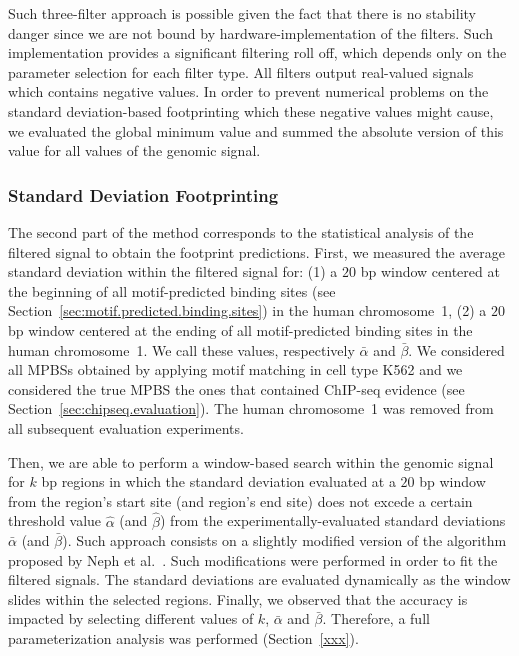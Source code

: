 Such three-filter approach is possible given the fact that there is no stability danger since we are not bound by hardware-implementation of the filters. Such implementation provides a significant filtering roll off, which depends only on the parameter selection for each filter type. All filters output real-valued signals which contains negative values. In order to prevent numerical problems on the standard deviation-based footprinting which these negative values might cause, we evaluated the global minimum value and summed the absolute version of this value for all values of the genomic signal.

\subsubsection{Standard Deviation Footprinting}
\label{sec:standard.deviation.footprinting}

The second part of the method corresponds to the statistical analysis of the filtered signal to obtain the footprint predictions. First, we measured the average standard deviation within the filtered signal for: (1) a $20$ bp window centered at the beginning of all motif-predicted binding sites (see Section~\ref{sec:motif.predicted.binding.sites}) in the human chromosome~1, (2) a $20$ bp window centered at the ending of all motif-predicted binding sites in the human chromosome~1. We call these values, respectively $ \bar{\alpha} $ and $ \bar{\beta} $. We considered all MPBSs obtained by applying motif matching in cell type K562 and we considered the true MPBS the ones that contained ChIP-seq evidence (see Section~\ref{sec:chipseq.evaluation}). The human chromosome~1 was removed from all subsequent evaluation experiments.

Then, we are able to perform a window-based search within the genomic signal for $ k $ bp regions in which the standard deviation evaluated at a $20$ bp window from the region's start site (and region's end site) does not excede a certain threshold value $ \hat{\alpha} $ (and $ \hat{\beta} $) from the experimentally-evaluated standard deviations $ \bar{\alpha} $ (and $ \bar{\beta} $). Such approach consists on a slightly modified version of the algorithm proposed by Neph et al.~\cite{neph2012a}. Such modifications were performed in order to fit the filtered signals. The standard deviations are evaluated dynamically as the window slides within the selected regions. Finally, we observed that the accuracy is impacted by selecting different values of $ k $, $ \bar{\alpha} $ and $ \bar{\beta} $. Therefore, a full parameterization analysis was performed (Section~\ref{xxx}).









